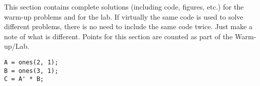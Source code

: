 This section contains complete solutions (including code, figures, etc.) for the warm-up problems and for the lab. If virtually the same code is used to solve different problems, there is no need to include the same code twice. Just make a note of what is different. Points for this section are counted as part of the Warm-up/Lab.

\begin{lstlisting}[style=code]
A = ones(2, 1);
B = ones(3, 1);
C = A' * B;
\end{lstlisting}